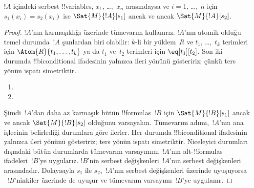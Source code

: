 \documentclass[../../../include/open-logic-section]{subfiles}
\begin{document}
\begin{prop}
$!A$ içindeki serbest !!{variable}s, $x_1$, \dots,~$x_n$ arasındaysa
ve $i = 1$, \dots,~$n$ için $s_1(x_i) = s_2(x_i)$ ise
$\Sat{M}{!A}[s_1]$ ancak ve ancak $\Sat{M}{!A}[s_2]$.
\end{prop}

\begin{proof}
$!A$'nın karmaşıklığı üzerinde tümevarım kullanırız. $!A$'nın atomik
olduğu temel durumda~$!A$ şunlardan biri olabilir:
$k$-li bir yüklem~$R$ ve $t_1$, \dots,~$t_k$ terimleri için
$\Atom{R}{t_1, \dots, t_k}$ ya da $t_1$ ve~$t_2$ terimleri için
$\eq[t_1][t_2]$. Son iki durumda !!{biconditional} ifadesinin yalnızca
ileri yönünü gösteririz; çünkü ters yönün ispatı simetriktir.

\begin{enumerate}


\item
\item
\end{enumerate}

Şimdi~$!A$'dan daha az karmaşık bütün !!{formula}s~$!B$ için
$\Sat{M}{!B}[s_1]$ ancak ve ancak $\Sat{M}{!B}[s_2]$ olduğunu
varsayalım. Tümevarım adımı,~$!A$'nın ana işlecinin belirlediği
durumlara göre ilerler. Her durumda !!{biconditional} ifadesinin yalnızca
ileri yönünü gösteririz; ters yönün ispatı simetriktir. Niceleyici
durumları dışındaki bütün durumlarda tümevarım varsayımını~$!A$'nın
alt-!!{formula}s ifadeleri~$!B$'ye uygularız. $!B$'nin serbest
değişkenleri~$!A$'nın serbest değişkenleri arasındadır. Dolayısıyla
$s_1$ ile $s_2$,~$!A$'nın serbest değişkenleri üzerinde uyuşuyorsa
~$!B$'ninkiler üzerinde de uyuşur ve tümevarım varsayımı~$!B$'ye
uygulanır.


\end{proof}
\end{document}
